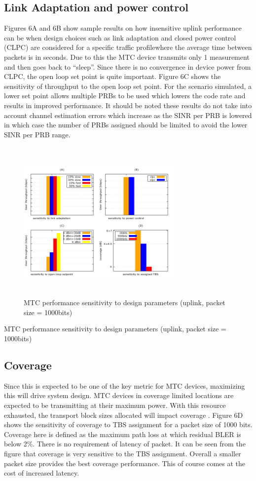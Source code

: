 \documentclass[conference,compsoc]{IEEEtran}
\begin{document}
\subsection{Link Adaptation and power control}
Figures 6A and 6B show sample results on how insensitive uplink performance can be when design choices such as link adaptation and closed power control (CLPC) are considered for a specific traffic profilewhere the average time between packets is in seconds. Due to this the MTC device transmits only 1 measurement and then goes back to “sleep”.  Since there is no convergence in device power from CLPC, the open loop set point is quite important. Figure 6C shows the sensitivity of throughput to the open loop set point.  For the scenario simulated, a lower set point allows multiple PRBs to be used which lowers the code rate and results in improved performance. It should be noted these results do not take into account channel estimation errors which increase as the SINR per PRB is lowered in which case the number of PRBs assigned should be limited to avoid the lower SINR per PRB range.

\begin{figure}[htbp]
\centerline{\includegraphics[height=80mm,width=80mm]{sensitivity_to_design.png}}
\caption{MTC performance sensitivity to design parameters (uplink, packet size = 1000bits)}
\label{fig_sensitivity}
\end{figure}



MTC performance sensitivity to design parameters (uplink, packet size = 1000bits)

\subsection{Coverage}
 	Since this is expected to be one of the key metric for MTC devices, maximizing this will drive system design. MTC devices in coverage limited locations are expected to be transmitting at their maximum power. With this resource exhausted, the transport block sizes allocated will impact  coverage . Figure 6D shows the sensitivity of coverage to TBS assignment for a packet size of  1000 bits.  Coverage here is defined as the maximum  path loss at which residual BLER is below 2\%. There is no requirement of latency of packet. It can be seen from the figure that coverage is very sensitive to the TBS assignment. Overall a smaller packet size provides the best coverage performance. This of course comes at the cost of increased latency.
    
\end{document}
